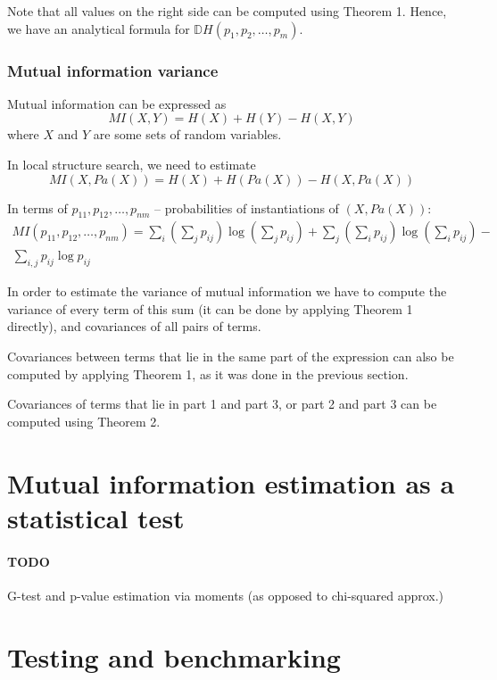 \documentclass{article}
\begin{document}
Note that all values on the right side can be computed using Theorem 1. Hence, we have an analytical formula for $\mathbb{D}H(p_1, p_2, \ldots, p_m)$.

\subsubsection{Mutual information variance}
Mutual information can be expressed as  
\begin{equation}
MI(X, Y) = H(X) + H(Y) - H(X, Y)
\end{equation}
where $X$ and $Y$ are some sets of random variables. 

In local structure search, we need to estimate
\begin{equation}
MI(X, Pa(X)) = H(X) + H(Pa(X)) - H(X, Pa(X))
\end{equation}

In terms of $p_{11}, p_{12}, \ldots, p_{nm}$ -- probabilities of instantiations of $(X, Pa(X))$:
\begin{multline}
MI(p_{11}, p_{12}, \ldots, p_{nm}) = \sum_i{(\sum_j{p_{ij}}) \log(\sum_j{p_{ij}})} + \sum_j{(\sum_i{p_{ij}}) \log(\sum_i{p_{ij}})} - \\ \sum_{i,j}{p_{ij} \log p_{ij}}
\end{multline}

In order to estimate the variance of mutual information we have to compute the variance of every term of this sum (it can be done by applying Theorem 1 directly), and covariances of all pairs of terms.

Covariances between terms that lie in the same part of the expression can also be computed by applying Theorem 1, as it was done in the previous section.

Covariances of terms that lie in part 1 and part 3, or part 2 and part 3 can be computed using Theorem 2.

\section{Mutual information estimation as a statistical test}
\paragraph{TODO} G-test and p-value estimation via moments (as opposed to chi-squared approx.)

\section{Testing and benchmarking}
\end{document}
